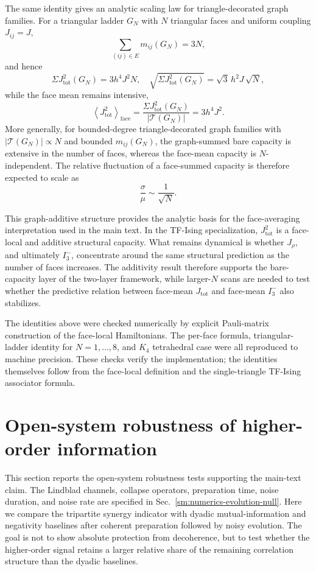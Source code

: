 \documentclass[aps,physrev,preprint,groupedaddress]{revtex4-2}
\begin{document}
The same identity gives an analytic scaling law for triangle-decorated graph families. For a triangular ladder $G_N$ with $N$ triangular faces and uniform coupling $J_{ij}=J$,
\begin{equation}
    \sum_{(ij)\in E}m_{ij}(G_N)=3N,
\end{equation}
and hence
\begin{equation}
    \Sigma J_{\mathrm{tot}}^2(G_N) = 3h^4J^2N, \quad
    \sqrt{\Sigma J_{\mathrm{tot}}^2(G_N)}=\sqrt3\,h^2J\,\sqrt{N},
\end{equation}
while the face mean remains intensive,
\begin{equation}
    \left\langle J_{\mathrm{tot}}^2\right\rangle_{\mathrm{face}}
    =\frac{\Sigma J_{\mathrm{tot}}^2(G_N)}{|\mathcal{T}(G_N)|} = 3h^4J^2 .
\end{equation}
More generally, for bounded-degree triangle-decorated graph families with $\lvert\mathcal T(G_N)\rvert\propto N$ and bounded $m_{ij}(G_N)$, the graph-summed bare capacity is extensive in the number of faces, whereas the face-mean capacity is $N$-independent. The relative fluctuation of a face-summed capacity is therefore expected to scale as
\begin{equation}
    \frac{\sigma}{\mu}\sim\frac{1}{\sqrt{N}}.
\end{equation}

This graph-additive structure provides the analytic basis for the face-averaging interpretation used in the main text. In the TF-Ising specialization, $J_{\mathrm{tot}}^2$ is a face-local and additive structural capacity. What remains dynamical is whether $J_\rho$, and
ultimately $I_3^-$, concentrate around the same structural prediction as the number of faces increases. The additivity result therefore supports the bare-capacity layer of the two-layer framework, while larger-$N$ scans are needed to test whether the predictive relation
between face-mean $J_{\mathrm{tot}}$ and face-mean $I_3^-$ also stabilizes.

The identities above were checked numerically by explicit Pauli-matrix construction of the face-local Hamiltonians. The per-face formula, triangular-ladder identity for $N=1,\ldots,8$, and $K_4$ tetrahedral case were all reproduced to machine precision. These checks verify the implementation; the identities themselves follow from the face-local definition and the single-triangle TF-Ising associator formula.

\section{Open-system robustness of higher-order information}\label{sm:open-system}
This section reports the open-system robustness tests supporting the main-text claim. The Lindblad channels, collapse operators, preparation time, noise duration, and noise rate are specified in Sec.~\ref{sm:numerics-evolution-null}. Here we compare the tripartite synergy indicator with dyadic mutual-information and negativity baselines after coherent preparation followed by noisy evolution. The goal is not to show absolute protection from decoherence, but to test whether the higher-order signal retains a larger relative share of the remaining correlation structure than the dyadic baselines.
\end{document}
